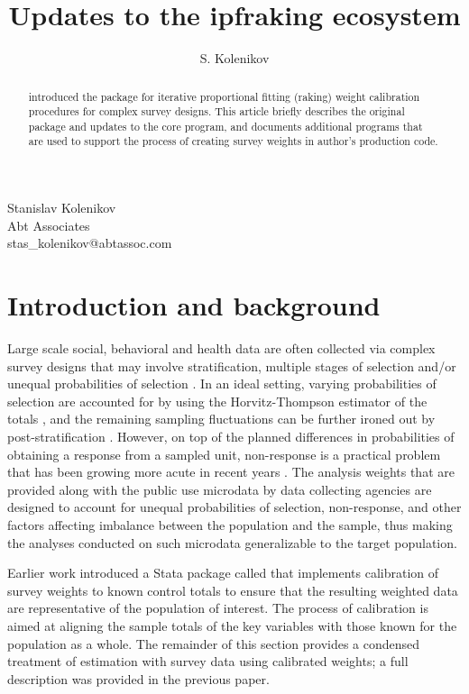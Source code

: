 \author{S. Kolenikov}{%
  Stanislav Kolenikov\\Abt Associates\\stas\_kolenikov@abtassoc.com
}
\title[Raking survey data: updates]{Updates to the ipfraking ecosystem}
\maketitle

\begin{abstract}
\citet{kolenikov:2014} introduced the package 
for iterative proportional fitting (raking) weight calibration procedures
for complex survey designs.
This article briefly describes the original package and updates to the core program, 
and documents additional programs that are used to support the process of creating
survey weights in author's production code.

\end{abstract}

\section{Introduction and background}

Large scale social, behavioral and health data are often collected
via complex survey designs that may involve stratification,
multiple stages of selection and/or unequal probabilities of selection
\citep{korn:graubard:1995,korn:graubard:1999}.
In an ideal setting, varying probabilities of selection are
accounted for by using the Horvitz-Thompson estimator of the totals
\citep{horvitz:thompson:1952,thompson:1997}, and the remaining
sampling fluctuations can be further ironed out by
post-stratification \citep{holt:smith:1979}.
However, on top of the planned differences in probabilities of obtaining
a response from a sampled unit, non-response is a practical problem
that has been growing more acute in recent years
\citep{groves:dillman:eltinge:little:2001,pew:2012}.
The analysis weights that are provided along with the public use
microdata by data collecting agencies are designed to account
for unequal probabilities of selection, non-response, and other factors
affecting imbalance between the population and the sample, thus making
the analyses conducted on such microdata generalizable to the target population.

Earlier work \citep{kolenikov:2014} introduced a Stata package
called  that implements
calibration of survey weights to known control totals to ensure
that the resulting weighted data are representative of the population
of interest. The process of calibration is aimed at aligning the sample totals
of the key variables with those known for the population as a whole.
The remainder of this section provides a condensed treatment of estimation
with survey data using calibrated weights; a full description was provided
in the previous paper.

